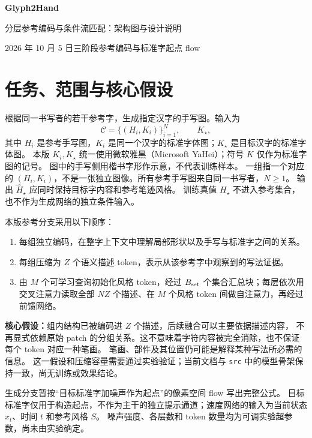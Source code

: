 \documentclass[UTF8,fontset=fandol,zihao=5,a4paper]{ctexart}
\begin{document}
\begin{center}
{\LARGE\bfseries Glyph2Hand}\par
\vspace{4pt}
{\large 分层参考编码与条件流匹配：架构图与设计说明}\par
\vspace{3pt}
{\small 2026 年 10 月 5 日\quad 三阶段参考编码与标准字起点 flow}
\end{center}

\section{任务、范围与核心假设}

根据同一书写者的若干参考字，生成指定汉字的手写图。输入为
\[
\mathcal C=\{(H_i,K_i)\}_{i=1}^{N},\qquad K_\star,
\]
其中 $H_i$ 是参考手写图，$K_i$ 是同一个汉字的标准字体图；$K_\star$ 是目标汉字的标准字体图。
本版 $K_i,K_\star$ 统一使用微软雅黑（Microsoft YaHei）；符号 $K$ 仅作为标准字图的记号。
图中的手写侧用楷书字形作示意，不代表训练样本。
一组指一个对应的 $(H_i,K_i)$，不是一张独立图像。所有参考手写图来自同一书写者，$N\geq1$。
输出 $\widehat H_\star$ 应同时保持目标字内容和参考笔迹风格。
训练真值 $H_\star$ 不进入参考集合，也不作为生成网络的独立条件输入。

本版参考分支采用以下顺序：
\begin{enumerate}
\item 每组独立编码，在整字上下文中理解局部形状以及手写与标准字之间的关系。
\item 每组压缩为 $Z$ 个语义描述 token，表示从该参考字中观察到的写法证据。
\item 由 $M$ 个可学习查询初始化风格 token，经过 $B_{\rm set}$ 个集合汇总块；每层依次用交叉注意力读取全部 $NZ$ 个描述、在 $M$ 个风格 token 间做自注意力，再经过前馈网络。
\end{enumerate}

\textbf{核心假设：}组内结构已被编码进 $Z$ 个描述，后续融合可以主要依据描述内容，
不再显式依赖原始 patch 的分组关系。这不意味着字符内容被完全消除，也不保证每个 token 对应一种笔画。
笔画、部件及其位置仍可能是解释某种写法所必需的信息。
这一假设和压缩容量需要通过实验验证；当前文档与 \texttt{src} 中的模型骨架保持一致，尚无训练或效果结论。

生成分支暂按“目标标准字加噪声作为起点”的像素空间 flow 写出完整公式。
目标标准字仅用于构造起点，不作为主干的独立提示通道；速度网络的输入为当前状态 $x_t$、时间 $t$ 和参考风格 $S$。
噪声强度、各层数和 token 数量均为可调实验超参数，尚未由实验确定。
\end{document}
